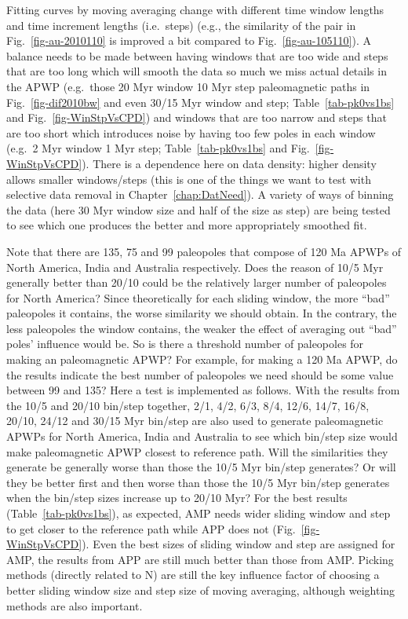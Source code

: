 Fitting curves by moving averaging change with different time window lengths and
time increment lengths (i.e.\ steps) (e.g., the similarity of the pair in
Fig.~\ref{fig-au-2010110} is improved a bit compared to
Fig.~\ref{fig-au-105110}). A balance needs to be made between having windows
that are too wide and steps that are too long which will smooth the data so much
we miss actual details in the APWP (e.g.\ those 20 Myr window 10 Myr step
paleomagnetic paths in Fig.~\ref{fig-dif2010bw} and even 30/15 Myr window and
step; Table~\ref{tab-pk0vs1bs} and Fig.~\ref{fig-WinStpVsCPD}) and windows that
are too narrow and steps that are too short which introduces noise by having too
few poles in each window (e.g.\ 2 Myr window 1 Myr step;
Table~\ref{tab-pk0vs1bs} and Fig.~\ref{fig-WinStpVsCPD}). There is a dependence
here on data density: higher density allows smaller windows/steps (this is one
of the things we want to test with selective data removal in Chapter~\ref{chap:DatNeed}). A
variety of ways of binning the data (here 30 Myr window size and
half of the size as step) are being tested to see which one produces the better
and more appropriately smoothed fit.

Note that there are 135, 75 and 99 paleopoles that compose of 120 Ma
APWPs of North America, India and Australia respectively. Does the reason of
10/5 Myr generally better than 20/10 could be the relatively larger number of
paleopoles for North America? Since theoretically for each sliding window, the
more ``bad'' paleopoles it contains, the worse similarity we should obtain. In
the contrary, the less paleopoles the window contains, the weaker the effect of
averaging out ``bad'' poles' influence would be. So is there a threshold number
of paleopoles for making an paleomagnetic APWP\@? For example, for making a
120 Ma APWP, do the results indicate the best number of paleopoles
we need should be some value between 99 and 135? Here a test is implemented as
follows. With the results from the 10/5 and 20/10 bin/step together, 2/1, 4/2,
6/3, 8/4, 12/6, 14/7, 16/8, 20/10, 24/12 and 30/15 Myr bin/step are also used to
generate paleomagnetic APWPs for North America, India and Australia to see which
bin/step size would make paleomagnetic APWP closest to reference path. Will the
similarities they generate be generally worse than those the 10/5 Myr bin/step
generates? Or will they be better first and then worse than those the 10/5 Myr
bin/step generates when the bin/step sizes increase up to 20/10 Myr? For the
best results (Table~\ref{tab-pk0vs1bs}), as expected, AMP needs wider sliding
window and step to get closer to the reference path while APP does not
(Fig.~\ref{fig-WinStpVsCPD}). Even the best sizes of sliding window and step are
assigned for AMP, the results from APP are still much better than those from
AMP\@. Picking methods (directly related to N) are still the key influence
factor of choosing a better sliding window size and step size of moving
averaging, although weighting methods are also important.

